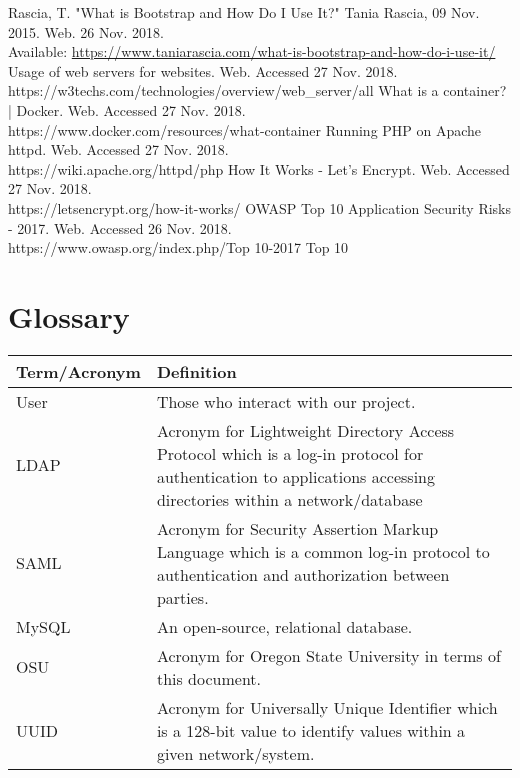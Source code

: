 \documentclass[onecolumn, draftclsnofoot,10pt, compsoc]{IEEEtran}
\begin{document}
\begin{thebibliography}{IEEEtran}
Rascia, T. "What is Bootstrap and How Do I Use It?" Tania Rascia, 09 Nov. 2015. Web. 26 Nov. 2018. \\
Available: \url{https://www.taniarascia.com/what-is-bootstrap-and-how-do-i-use-it/}
Usage of web servers for websites. Web. Accessed 27 Nov. 2018.\\
https://w3techs.com/technologies/overview/web\_server/all
What is a container? | Docker. Web. Accessed 27 Nov. 2018.\\
https://www.docker.com/resources/what-container
Running PHP on Apache httpd. Web. Accessed 27 Nov. 2018.\\
https://wiki.apache.org/httpd/php
How It Works - Let's Encrypt. Web. Accessed 27 Nov. 2018.\\
https://letsencrypt.org/how-it-works/
OWASP Top 10 Application Security Risks - 2017. Web. Accessed 26 Nov. 2018.\\
https://www.owasp.org/index.php/Top 10-2017 Top 10
\end{thebibliography}

\section*{Glossary}
  \begin{tabu} to 
        \hline
        \textbf{Term/Acronym} & \textbf{Definition}\\
        \hline
        User & Those who interact with our project. \\
        \hline
        LDAP & Acronym for Lightweight Directory Access Protocol which is a log-in protocol for authentication to applications accessing directories within a network/database\\
        \hline
        SAML & Acronym for Security Assertion Markup Language which is a common log-in protocol to authentication and authorization between parties.\\
        \hline
        MySQL & An open-source, relational database.\\
        \hline
        OSU & Acronym for Oregon State University in terms of this document.\\
        \hline
        UUID & Acronym for Universally Unique Identifier which is a 128-bit value to identify values within a given network/system.\\
        \hline
\end{tabu}
\end{document}
